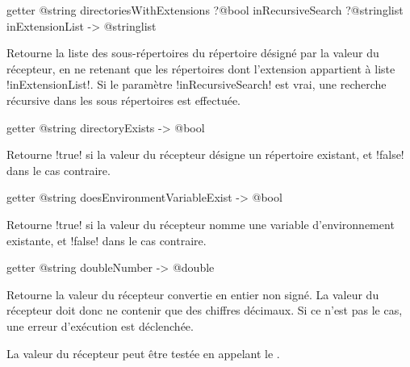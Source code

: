 
\begin{galgas3box}
getter @string directoriesWithExtensions
    ?@bool inRecursiveSearch
    ?@stringlist inExtensionList -> @stringlist
\end{galgas3box}

Retourne la liste des sous-répertoires du répertoire désigné par la valeur du récepteur, en ne retenant que les répertoires dont l'extension appartient à liste \ggst!inExtensionList!. Si le paramètre \ggst!inRecursiveSearch! est vrai, une recherche récursive dans les sous répertoires est effectuée.









\begin{galgas3box}
getter @string directoryExists -> @bool
\end{galgas3box}

Retourne \ggst!true! si la valeur du récepteur désigne un répertoire existant, et \ggst!false! dans le cas contraire.









\begin{galgas3box}
getter @string doesEnvironmentVariableExist -> @bool
\end{galgas3box}

Retourne \ggst!true! si la valeur du récepteur nomme une variable d'environnement existante, et \ggst!false! dans le cas contraire.









\begin{galgas3box}
getter @string doubleNumber -> @double
\end{galgas3box}

Retourne la valeur du récepteur convertie en entier non signé. La valeur du récepteur doit donc ne contenir que des chiffres décimaux. Si ce n'est pas le cas, une erreur d'exécution est déclenchée.

La valeur du récepteur peut être testée en appelant le .

